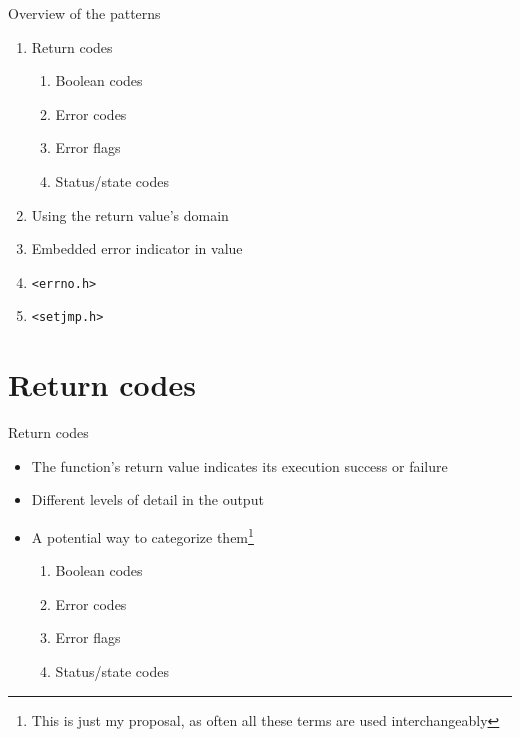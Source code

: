 \documentclass[aspectratio=169,14pt]{beamer}
\begin{document}
\begin{frame}{Overview of the patterns}
\begin{enumerate}
    \item Return codes\\
    \begin{enumerate}
        \item Boolean codes
        \item Error codes
        \item Error flags
        \item Status/state codes
    \end{enumerate}
    \item Using the return value's domain
    \item Embedded error indicator in value
    \item \texttt{<errno.h>}
    \item \texttt{<setjmp.h>}
\end{enumerate}
\end{frame}





\section{Return codes}

\begin{frame}{Return codes}
\begin{itemize}
    \item The function's return value indicates its execution success or failure
    \item Different levels of detail in the output
    \item A potential way to categorize them\footnote{This is just my proposal, as often all these terms are used interchangeably}\\
    \begin{enumerate}
        \item Boolean codes
        \item Error codes
        \item Error flags
        \item Status/state codes
    \end{enumerate}
\end{itemize}
\end{frame}
\end{document}
